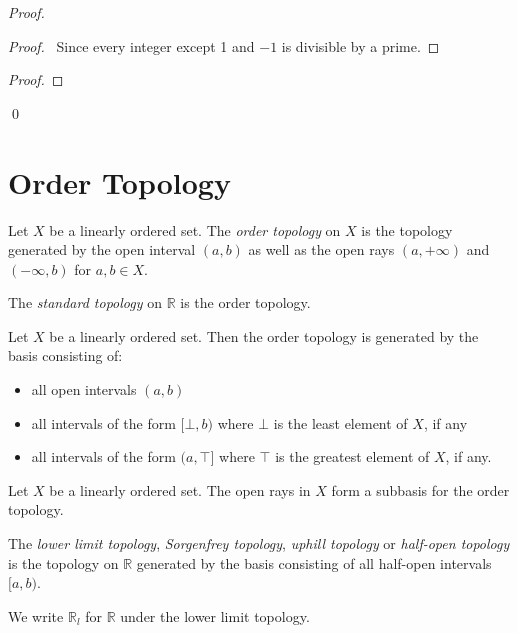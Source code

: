 \begin{proof}
\begin{proof}
	\pf\ Since every integer except 1 and $-1$ is divisible by a prime.
\end{proof}
\begin{proof}
\end{proof}
\qed
\end{proof}

\section{Order Topology}

\begin{df}
Let $X$ be a linearly ordered set. The \emph{order topology} on $X$ is the topology generated by the open interval $(a,b)$ as well as the open rays $(a, + \infty)$ and $(-\infty, b)$ for $a,b \in X$.

The \emph{standard topology} on $\mathbb{R}$ is the order topology.
\end{df}

\begin{prop}
Let $X$ be a linearly ordered set. Then the order topology is generated by the basis consisting of:
\begin{itemize}
\item all open intervals $(a,b)$
\item all intervals of the form $[\bot, b)$ where $\bot$ is the least element of $X$, if any
\item all intervals of the form $(a, \top]$ where $\top$ is the greatest element of $X$, if any.
\end{itemize}
\end{prop}

\begin{prop}
Let $X$ be a linearly ordered set. The open rays in $X$ form a subbasis for the order topology.
\end{prop}

\begin{df}
The \emph{lower limit topology}, \emph{Sorgenfrey topology}, \emph{uphill topology} or \emph{half-open topology} is the topology on $\mathbb{R}$ generated by the basis consisting of all half-open intervals $[a,b)$.

We write $\mathbb{R}_l$ for $\mathbb{R}$ under the lower limit topology.
\end{df}

